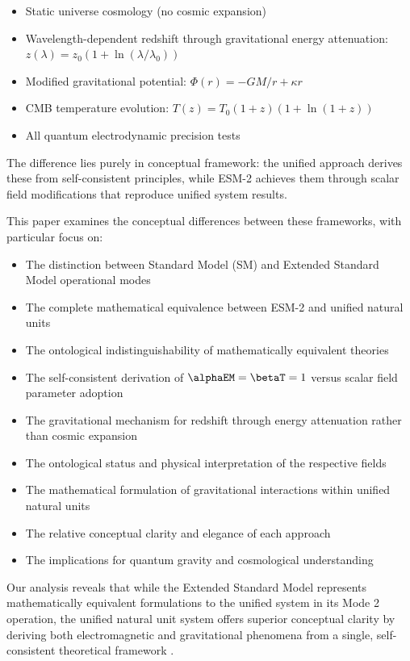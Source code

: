 	\begin{itemize}
		\item Static universe cosmology (no cosmic expansion)
		\item Wavelength-dependent redshift through gravitational energy attenuation: $z(\lambda) = z_0(1 + \ln(\lambda/\lambda_0))$
		\item Modified gravitational potential: $\Phi(r) = -GM/r + \kappa r$
		\item CMB temperature evolution: $T(z) = T_0(1+z)(1+\ln(1+z))$
		\item All quantum electrodynamic precision tests \cite{pascher_muon_g2_2025}
	\end{itemize}
	
	The difference lies purely in conceptual framework: the unified approach derives these from self-consistent principles, while ESM-2 achieves them through scalar field modifications that reproduce unified system results.
	
	This paper examines the conceptual differences between these frameworks, with particular focus on:
	
	\begin{itemize}
		\item The distinction between Standard Model (SM) and Extended Standard Model operational modes
		\item The complete mathematical equivalence between ESM-2 and unified natural units
		\item The ontological indistinguishability of mathematically equivalent theories
		\item The self-consistent derivation of $\alphaEM = \betaT = 1$ versus scalar field parameter adoption
		\item The gravitational mechanism for redshift through energy attenuation rather than cosmic expansion \cite{Adams1925,Pound1960}
		\item The ontological status and physical interpretation of the respective fields
		\item The mathematical formulation of gravitational interactions within unified natural units \cite{pascher_lagrangian_2025}
		\item The relative conceptual clarity and elegance of each approach
		\item The implications for quantum gravity and cosmological understanding
	\end{itemize}
	
	Our analysis reveals that while the Extended Standard Model represents mathematically equivalent formulations to the unified system in its Mode 2 operation, the unified natural unit system offers superior conceptual clarity by deriving both electromagnetic and gravitational phenomena from a single, self-consistent theoretical framework \cite{pascher_pragmatic_2025}.
	
